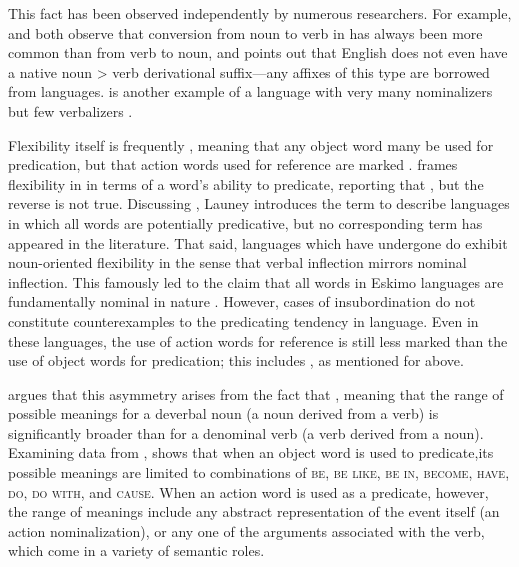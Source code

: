 This fact has been observed independently by numerous researchers. For example, \textcite[251]{Stevick1968} and \textcite[373--374]{Marchand1969} both observe that conversion from noun to verb in  has always been more common than from verb to noun, and \textcite[98]{Kastovsky1996} points out that English does not even have a native noun > verb derivational suffix—any affixes of this type are borrowed from  languages.  is another example of a language with very many nominalizers but few verbalizers \parencite[158]{Mithun2017}.

Flexibility itself is frequently , meaning that any object word many be used for predication, but that action words used for reference are marked \parencites[69]{Croft2001b}[§3.3]{EvansOsada2005}{Beck2013}. \textcite[44]{Nakayama2001} frames flexibility in  in terms of a word's ability to predicate, reporting that , but the reverse is not true. Discussing , Launey \parencites*{Launey1994}{Launey2004} introduces the term  to describe languages in which all words are potentially predicative, but no corresponding term  has appeared in the literature. That said, languages which have undergone   do exhibit noun-oriented flexibility in the sense that verbal inflection mirrors nominal inflection. This famously led to the claim that all words in Eskimo languages are fundamentally nominal in nature \parencite{Sadock1999}. However, cases of insubordination do not constitute counterexamples to the predicating tendency in language. Even in these languages, the use of action words for reference is still less marked than the use of object words for predication; this includes , as mentioned for  above.

\textcite{Kastovsky1996} argues that this asymmetry arises from the fact that , meaning that the range of possible meanings for a deverbal noun (a noun derived from a verb) is significantly broader than for a denominal verb (a verb derived from a noun). Examining data from , \citeauthor{Kastovsky1996} shows that when an object word is used to predicate,its possible meanings are limited to combinations of \textsc{be}, \textsc{be like}, \textsc{be in}, \textsc{become}, \textsc{have}, \textsc{do}, \textsc{do with}, and \textsc{cause}. When an action word is used as a predicate, however, the range of meanings include any abstract representation of the event itself (an action nominalization), or any one of the arguments associated with the verb, which come in a variety of semantic roles.

